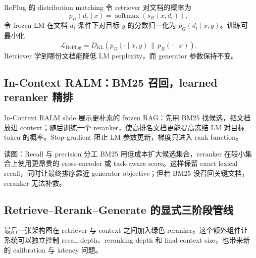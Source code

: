 
\begin{importantbox}{RePlug 的 distribution matching}
令 retriever 对文档的概率为
\[
p_R(d_i\mid x)=\operatorname{softmax}(s_R(x,d_i)),
\]
令 frozen LM 在文档 $d_i$ 条件下对目标 $y$ 的分数归一化为 $p_G(d_i\mid x,y)$。训练可最小化
\[
\mathcal{L}_{\text{RePlug}}=D_{\mathrm{KL}}\!\left(p_G(\cdot\mid x,y)\,\|\,p_R(\cdot\mid x)\right).
\]
Retriever 学到哪份文档能降低 LM perplexity，而 generator 参数保持不变。
\end{importantbox}


\subsection{In-Context RALM：BM25 召回，learned reranker 精排}

In-Context RALM slide 展示更朴素的 frozen RAG：先用 BM25 找候选，把文档放进 context；随后训练一个 reranker，使高排名文档更能提高冻结 LM 对目标 token 的概率。Stop-gradient 阻止 LM 参数更新，梯度只进入 rank function。


\begin{knowledgebox}{读图：Recall 与 precision 分工}
BM25 用低成本扩大候选集合，reranker 在较小集合上使用更昂贵的 cross-encoder 或 task-aware score。这样保留 exact lexical recall，同时让最终排序靠近 generator objective；但若 BM25 没召回关键文档，reranker 无法补救。
\end{knowledgebox}

\subsection{Retrieve--Rerank--Generate 的显式三阶段管线}

最后一张架构图在 retriever 与 context 之间加入绿色 reranker。这个额外组件让系统可以独立控制 recall depth、reranking depth 和 final context size，也带来新的 calibration 与 latency 问题。


